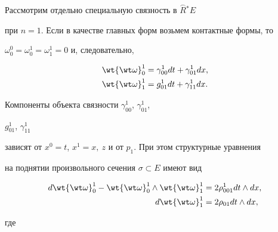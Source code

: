Рассмотрим отдельно специальную связность в $\overset{\frown}{R}{}^ * E$


при $n=1$. Если в качестве главных форм возьмем контактные формы, то


$\omega_0^0=\omega_0^1=\omega_1^1=0$ и, следовательно,


\begin{equation}


\begin{split}


{\wt {\wt \omega}}_0^1&=\gamma_{00}^1 dt+\gamma_{01}^1 dx, \\


{\wt {\wt \omega}}_1^1&=g_{01}^1 dt+\gamma_{11}^1 dx. 


\end{split} 


\end{equation}


Компоненты объекта связности $\gamma_{00}^1$, $\gamma_{01}^1$,


$g_{01}^1$, $\gamma_{11}^1$


зависят от $x^0=t$, $x^1=x,\ z$ и от $p_1$. При этом структурные уравнения


на поднятии произвольного сечения $\sigma \subset E$ имеют вид


\begin{equation}


\begin{split}


d{\wt {\wt \omega}}_0^1-{\wt {\wt \omega}}_0^1


\wedge {\wt {\wt \omega}}_1^1&=2\rho_{001}^1 dt \wedge dx, \\


d{\wt {\wt \omega}}_1^1&=2\rho_{01} dt \wedge dx, 


\end{split} 


\end{equation}


где


